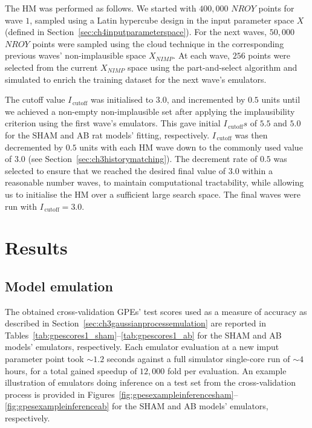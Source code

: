 \vspace{0.2cm}
The HM was performed as follows. We started with $400,000$ $NROY$ points for wave $1$, sampled using a Latin hypercube design in the input parameter space $X$ (defined in Section~\ref{sec:ch4inputparameterspace}). For the next waves, $50,000$ $NROY$ points were sampled using the cloud technique in the corresponding previous waves' non-implausible space $X_{NIMP}$. At each wave, $256$ points were selected from the current $X_{NIMP}$ space using the part-and-select algorithm and simulated to enrich the training dataset for the next wave's emulators.

\vspace{0.2cm}
The cutoff value $I_{\,\text{cutoff}}$ was initialised to $3.0$, and incremented by $0.5$ units until we achieved a non-empty non-implausible set after applying the implausibility criterion using the first wave's emulators. This gave initial $I_{\,\text{cutoff}}s$ of $5.5$ and $5.0$ for the SHAM and AB rat models’ fitting, respectively. $I_{\,\text{cutoff}}$ was then decremented by $0.5$ units with each HM wave down to the commonly used value of $3.0$ (see Section~\ref{sec:ch3historymatching}). The decrement rate of $0.5$ was selected to ensure that we reached the desired final value of $3.0$ within a reasonable number waves, to maintain computational tractability, while allowing us to initialise the HM over a sufficient large search space. The final waves were run with $I_{\,\text{cutoff}}=3.0$.


%
%
%
\section{Results}\label{sec:ch4results}

%
%
%
\subsection{Model emulation}
The obtained cross-validation GPEs' test scores used as a measure of accuracy as described in Section~\ref{sec:ch3gaussianprocessemulation} are reported in Tables~\ref{tab:gpescores1_sham}--\ref{tab:gpescores1_ab} for the SHAM and AB models' emulators, respectively. Each emulator evaluation at a new imput parameter point took $\sim 1.2$ seconds against a full simulator single-core run of $\sim 4$ hours, for a total gained speedup of $12,000$ fold per evaluation. An example illustration of emulators doing inference on a test set from the cross-validation process is provided in Figures~\ref{fig:gpesexampleinferencesham}--\ref{fig:gpesexampleinferenceab} for the SHAM and AB models' emulators, respectively.

